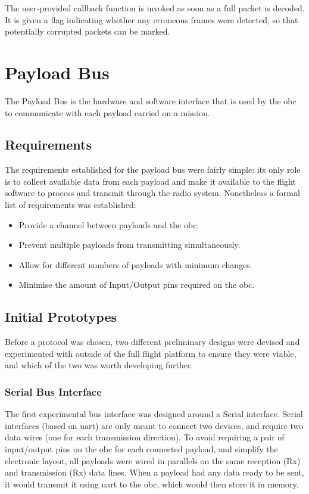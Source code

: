 The user-provided callback function is invoked as soon as a full packet is
decoded. It is given a flag indicating whether any erroneous frames were
detected, so that potentially corrupted packets can be marked.

\section{Payload Bus}
\label{sec:payload-bus}

The Payload Bus is the hardware and software interface that is used by the
\acrfull{obc} to communicate with each payload carried on a mission.

\subsection{Requirements}

The requirements established for the payload bus were fairly simple: its only
role is to collect available data from each payload and make it available to
the flight software to process and transmit through the radio system.
Nonetheless a formal list of requirements was established:

\begin{itemize}
\item Provide a channel between payloads and the \acrshort{obc}.
\item Prevent multiple payloads from transmitting simultaneously.
\item Allow for different numbers of payloads with minimum changes.
\item Minimise the amount of Input/Output pins required on the \acrshort{obc}.
\end{itemize}

\subsection{Initial Prototypes}

Before a protocol was chosen, two different preliminary designs were devised
and experimented with outside of the full flight platform to ensure they were
viable, and which of the two was worth developing further.

\subsubsection{Serial Bus Interface}

The first experimental bus interface was designed around a Serial interface.
Serial interfaces (based on \acrshort{uart}) are only meant to connect two
devices, and require two data wires (one for each transmission direction). To
avoid requiring a pair of input/output pins on the \acrlong{obc} for each
connected payload, and simplify the electronic layout, all payloads were wired
in parallels on the same reception (Rx) and transmission (Rx) data lines. When
a payload had any data ready to be sent, it would transmit it using
\acrshort{uart} to the \acrshort{obc}, which would then store it in memory.


